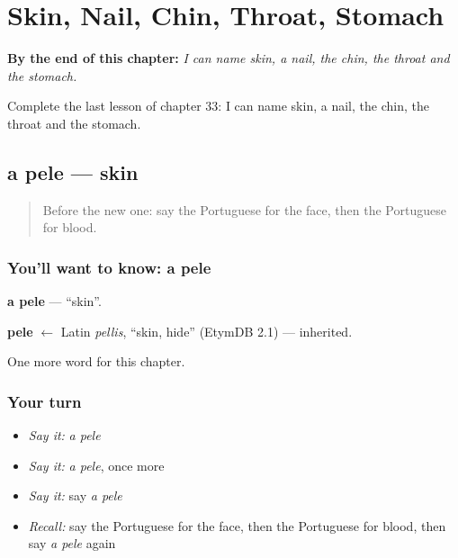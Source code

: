 
\chapter{Skin, Nail, Chin, Throat, Stomach}
\label{ch:pt-skin-nail-chin-throat-stomach}

\begin{chapteropening}
\textbf{By the end of this chapter:} \emph{I can name skin, a nail, the chin, the throat and the stomach.}

Complete the last lesson of chapter 33: I can name skin, a nail, the chin, the throat and the stomach.
\end{chapteropening}

\section[a pele]{a pele — skin}

\label{lesson:PT-C33-pele}



\begin{quote}
Before the new one: say the Portuguese for the face, then the Portuguese for blood.
\end{quote}

\subsection*{You'll want to know: a pele}
\textbf{a pele} — \textquotedblleft{}skin\textquotedblright{}.

\begin{cousinweb}
\textbf{pele} $\leftarrow$ Latin \emph{pellis}, \textquotedblleft{}skin, hide\textquotedblright{} (EtymDB 2.1) — inherited.
\end{cousinweb}

\begin{grammarlens}[title={What you've built}]
One more word for this chapter.
\end{grammarlens}

\subsection*{Your turn}
\begin{itemize}
\raggedright
  \item \emph{Say it:} \emph{a pele}
  \item \emph{Say it:} \emph{a pele}, once more
  \item \emph{Say it:} say \emph{a pele}
  \item \emph{Recall:} say the Portuguese for the face, then the Portuguese for blood, then say \emph{a pele} again
\end{itemize}

